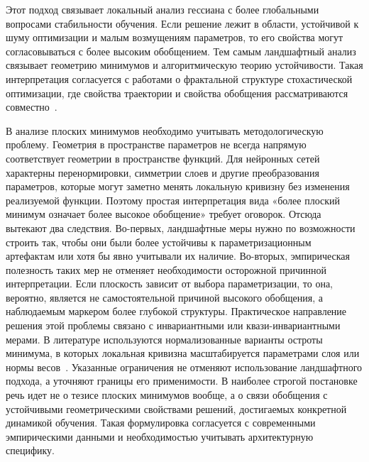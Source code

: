 \documentclass[russian]{intsys}
\begin{document}
Этот подход связывает локальный анализ гессиана с более глобальными вопросами стабильности обучения.
Если решение лежит в области, устойчивой к шуму оптимизации и малым возмущениям параметров, то его свойства могут согласовываться с более высоким обобщением.
Тем самым ландшафтный анализ связывает геометрию минимумов и алгоритмическую теорию устойчивости.
Такая интерпретация согласуется с работами о фрактальной структуре стохастической оптимизации, где свойства траектории и свойства обобщения рассматриваются совместно~\cite{fractal2019sgd}.

В анализе плоских минимумов необходимо учитывать методологическую проблему. Геометрия в пространстве параметров не всегда напрямую соответствует геометрии в пространстве функций.
Для нейронных сетей характерны перенормировки, симметрии слоев и другие преобразования параметров, которые могут заметно менять локальную кривизну без изменения реализуемой функции.
Поэтому простая интерпретация вида «более плоский минимум означает более высокое обобщение» требует оговорок.
Отсюда вытекают два следствия.
Во-первых, ландшафтные меры нужно по возможности строить так, чтобы они были более устойчивы к параметризационным артефактам или хотя бы явно учитывали их наличие.
Во-вторых, эмпирическая полезность таких мер не отменяет необходимости осторожной причинной интерпретации.
Если плоскость зависит от выбора параметризации, то она, вероятно, является не самостоятельной причиной высокого обобщения, а наблюдаемым маркером более глубокой структуры.
Практическое направление решения этой проблемы связано с инвариантными или квази-инвариантными мерами. В литературе используются нормализованные варианты остроты минимума, в которых локальная кривизна масштабируется параметрами слоя или нормы весов~\cite{normalizedflat2019}.
Указанные ограничения не отменяют использование ландшафтного подхода, а уточняют границы его применимости.
В наиболее строгой постановке речь идет не о тезисе плоских минимумов вообще, а о связи обобщения с устойчивыми геометрическими свойствами решений, достигаемых конкретной динамикой обучения.
Такая формулировка согласуется с современными эмпирическими данными и необходимостью учитывать архитектурную специфику.
\end{document}
